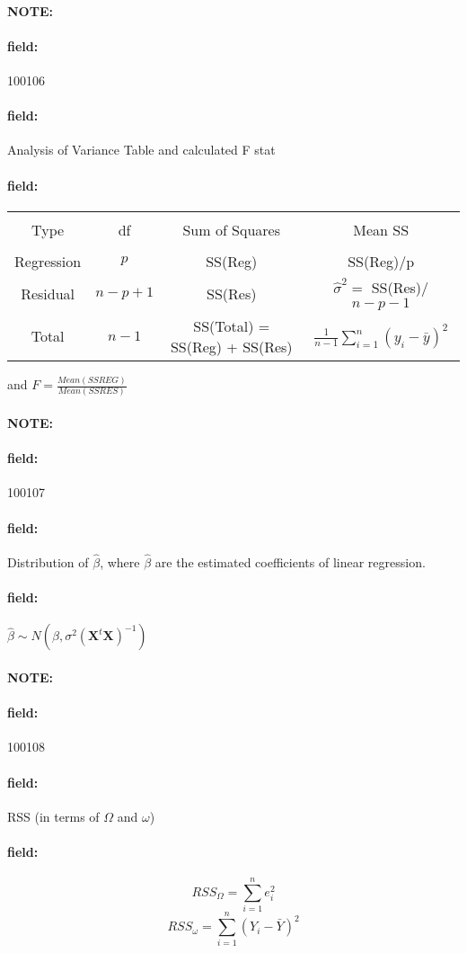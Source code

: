 \documentclass[12pt]{article}
\newenvironment{note}{\paragraph{NOTE:}}{}
\newenvironment{field}{\paragraph{field:}}{}
\begin{document}
\begin{note} \begin{field} \tiny 100106 \end{field}
 \begin{field}
  Analysis of Variance Table and calculated F stat
 \end{field}
 \begin{field}
  \begin{tabular}{|c|c|c|c|}
   \hline                                                                                                \\
   Type       & df      & Sum of Squares                & Mean SS                                        \\
   \hline                                                                                                \\
   Regression & $p$     & SS(Reg)                       & SS(Reg)/p                                      \\
   Residual   & $n-p+1$ & SS(Res)                       & $\hat{\sigma}^2 =$ SS(Res)/$n-p-1$             \\
   Total      & $n-1$   & SS(Total) = SS(Reg) + SS(Res) & $\frac{1}{n-1} \sum_{i=1}^n (y_i - \bar{y})^2$ \\
   \hline
  \end{tabular}
  and $F = \frac{Mean(SSREG)}{Mean(SSRES)}$
 \end{field}
\end{note}

\begin{note} \begin{field} \tiny 100107 \end{field}
 \begin{field}
  Distribution of $\hat{\beta}$, where $\hat{\beta}$ are the estimated coefficients of linear regression.
 \end{field}
 \begin{field}
  $\hat{\beta} \sim N(\beta, \sigma^2(\mathbf{X}^t \mathbf{X})^{-1})$
 \end{field}
\end{note}

\begin{note} \begin{field} \tiny 100108 \end{field}
 \begin{field}
  RSS (in terms of $\Omega$ and $\omega$)
 \end{field}
 \begin{field}
  $$RSS_\Omega = \sum_{i=1}^n e_i^2$$
  $$RSS_\omega = \sum_{i=1}^n (Y_i - \bar{Y})^2$$
 \end{field}
\end{note}
\end{document}
